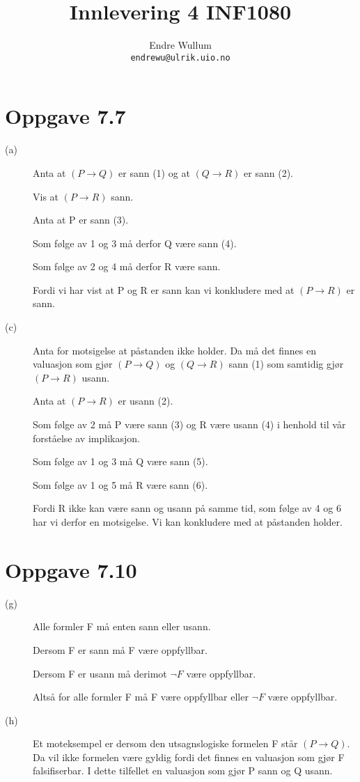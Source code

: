 \documentclass[12pt,norsk,a4paper]{article}
\title{Innlevering 4 INF1080}
\author{Endre Wullum\\ \texttt{endrewu@ulrik.uio.no}}
\begin{document}
\maketitle

\section*{Oppgave 7.7}
\begin{description}
\item[(a)] Anta at $(P \rightarrow Q)$ er sann (1) og at $(Q \rightarrow R)$ er sann (2).

Vis at $(P \rightarrow R)$ sann.

Anta at P er sann (3).

Som følge av 1 og 3 må derfor Q være sann (4).

Som følge av 2 og 4 må derfor R være sann.

Fordi vi har vist at P og R er sann kan vi konkludere med at $(P \rightarrow R)$ er sann.

\item[(c)] Anta for motsigelse at påstanden ikke holder. Da må det finnes en valuasjon som gjør  $(P \rightarrow Q)$ og $(Q \rightarrow R)$ sann (1) som samtidig gjør $(P \rightarrow R)$ usann.

Anta at $(P \rightarrow R)$ er usann (2).

Som følge av 2 må P være sann (3) og R være usann (4) i henhold til vår forståelse av implikasjon.

Som følge av 1 og 3 må Q være sann (5).

Som følge av 1 og 5 må R være sann (6).

Fordi R ikke kan være sann og usann på samme tid, som følge av 4 og 6 har vi derfor en motsigelse. Vi kan konkludere med at påstanden holder.
\end{description}

\section*{Oppgave 7.10}
\begin{description}
\item[(g)] Alle formler F må enten sann eller usann.

Dersom F er sann må F være oppfyllbar.

Dersom F er usann må derimot $\neg F$ være oppfyllbar.

Altså for alle formler F må F være oppfyllbar eller $\neg F$ være oppfyllbar.
\item[(h)] Et moteksempel er dersom den utsagnslogiske formelen F står $(P \rightarrow Q)$.
Da vil ikke formelen være gyldig fordi det finnes en valuasjon som gjør F falsifiserbar. I dette tilfellet en valuasjon som gjør P sann og Q usann. 
\end{description}


\end{document}
